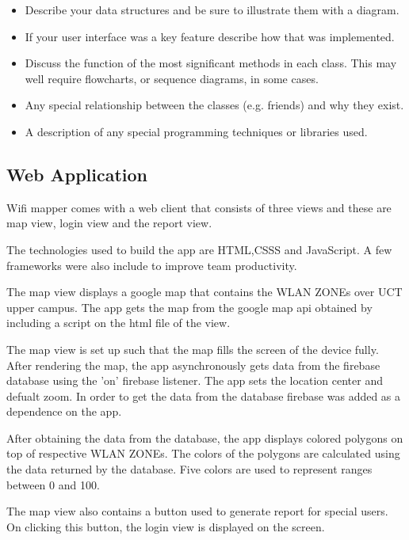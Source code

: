 \begin{itemize}
\item Describe your data structures and be sure to illustrate them
  with a diagram.

\item If your user interface was a key feature describe how that was
  implemented.

\item Discuss the function of the most significant methods in each
  class. This may well require flowcharts, or sequence diagrams, in
  some cases.

\item Any special relationship between the classes (e.g. friends) and
  why they exist.

\item A description of any special programming techniques or libraries
  used.
\end{itemize}

\subsection*{Web Application}
Wifi mapper comes with a web client that consists of three views and these are map view, login view and the report view.  

The technologies used to build the app are HTML,CSSS and JavaScript. A few frameworks were also include to improve team productivity.

The map view displays a google map that contains the WLAN ZONEs over UCT upper campus. The app gets the map from the google map api obtained by including a script on the html file of the view.

The map view is set up such that the map fills the screen of the device fully. After rendering the map, the app asynchronously gets data from the firebase database using the 'on' firebase listener. The app sets the location center and defualt zoom. In order to get the data from the database firebase was added as a dependence on the app. 

After obtaining the data from the database, the app displays colored polygons on top of respective WLAN ZONEs. The colors of the polygons are calculated using the data returned by the database. Five colors are used to represent ranges between 0 and 100. 

The map view also contains a button used to generate report for special users. On clicking this button, the login view is displayed on the screen.

